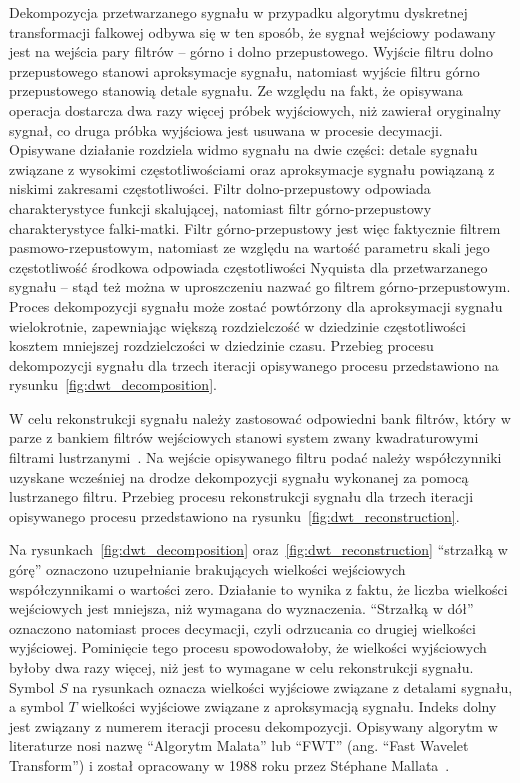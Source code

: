Dekompozycja przetwarzanego sygnału w przypadku algorytmu dyskretnej transformacji falkowej odbywa się w ten sposób, że sygnał wejściowy podawany jest na wejścia pary filtrów -- górno i dolno przepustowego. Wyjście filtru dolno przepustowego stanowi aproksymacje sygnału, natomiast wyjście filtru górno przepustowego stanowią detale sygnału. Ze względu na fakt, że opisywana operacja dostarcza dwa razy więcej próbek wyjściowych, niż zawierał oryginalny sygnał, co druga próbka wyjściowa jest usuwana w procesie decymacji. Opisywane działanie rozdziela widmo sygnału na dwie części: detale sygnału związane z wysokimi częstotliwościami oraz aproksymacje sygnału powiązaną z niskimi zakresami częstotliwości. Filtr dolno-przepustowy odpowiada charakterystyce funkcji skalującej, natomiast filtr górno-przepustowy charakterystyce falki-matki. Filtr górno-przepustowy jest więc faktycznie filtrem pasmowo-rzepustowym, natomiast ze względu na wartość parametru skali jego częstotliwość środkowa odpowiada częstotliwości Nyquista dla przetwarzanego sygnału -- stąd też można w uproszczeniu nazwać go filtrem górno-przepustowym. Proces dekompozycji sygnału może zostać powtórzony dla aproksymacji sygnału wielokrotnie, zapewniając większą rozdzielczość w dziedzinie częstotliwości kosztem mniejszej rozdzielczości w dziedzinie czasu. Przebieg procesu dekompozycji sygnału dla trzech iteracji opisywanego procesu przedstawiono na rysunku~\ref{fig:dwt_decomposition}.

W celu rekonstrukcji sygnału należy zastosować odpowiedni bank filtrów, który w parze z bankiem filtrów wejściowych stanowi system zwany kwadraturowymi filtrami lustrzanymi~\cite{johnston_filter}. Na wejście opisywanego filtru podać należy współczynniki uzyskane wcześniej na drodze dekompozycji sygnału wykonanej za pomocą lustrzanego filtru. Przebieg procesu rekonstrukcji sygnału dla trzech iteracji opisywanego procesu przedstawiono na rysunku~\ref{fig:dwt_reconstruction}.

Na rysunkach~\ref{fig:dwt_decomposition} oraz~\ref{fig:dwt_reconstruction} \enquote{strzałką w górę} oznaczono uzupełnianie brakujących wielkości wejściowych współczynnikami o wartości zero. Działanie to wynika z faktu, że liczba wielkości wejściowych jest mniejsza, niż wymagana do wyznaczenia. \enquote{Strzałką w dół} oznaczono natomiast proces decymacji, czyli odrzucania co drugiej wielkości wyjściowej. Pominięcie tego procesu spowodowałoby, że wielkości wyjściowych byłoby dwa razy więcej, niż jest to wymagane w celu rekonstrukcji sygnału. Symbol $S$ na rysunkach oznacza wielkości wyjściowe związane z detalami sygnału, a symbol $T$ wielkości wyjściowe związane z aproksymacją sygnału. Indeks dolny jest związany z numerem iteracji procesu dekompozycji. Opisywany algorytm w literaturze nosi nazwę \enquote{Algorytm Malata} lub \enquote{FWT} (ang. \enquote{Fast Wavelet Transform}) i został opracowany w 1988 roku przez Stéphane Mallata~\cite{lujian_mallat}.

